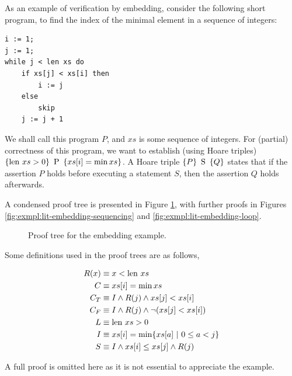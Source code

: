 \begin{example}
  \label{exmpl:lit-embedding}
  As an example of verification by embedding, consider the following
  short program, to find the index of the minimal element in a
  sequence of integers:

\begin{verbatim}
i := 1;
j := 1;
while j < len xs do
    if xs[j] < xs[i] then
        i := j
    else
        skip
    j := j + 1
\end{verbatim}

  We shall call this program $P$, and $xs$ is some sequence of
  integers. For (partial) correctness of this program, we want to
  establish (using Hoare triples) $\htriple{\len xs > 0}{P}{xs[i] =
    \min xs}$. A Hoare triple $\htriple{P}{S}{Q}$ states that if the
  assertion $P$ holds before executing a statement $S$, then the
  assertion $Q$ holds afterwards.

  A condensed proof tree is presented in Figure
  \ref{fig:exmpl:lit-embedding-tree}, with further proofs in Figures
  \ref{fig:exmpl:lit-embedding-sequencing} and
  \ref{fig:exmpl:lit-embedding-loop}.

  \begin{figure}[t]
    \centering
    \begin{prooftree}


    \end{prooftree}
    \caption{Proof tree for the embedding example.}
    \label{fig:exmpl:lit-embedding-tree}
  \end{figure}

  Some definitions used in the proof trees are as follows,

  \begin{align*}
    R(x) &\equiv x < \len xs\\
    C    &\equiv xs[i] = \min xs\\
    C_{T} & \equiv I \land R(j) \land xs[j] < xs[i]\\
    C_{F} & \equiv I \land R(j) \land \lnot(xs[j] < xs[i])\\
    L    & \equiv \len xs > 0\\
    I    & \equiv xs[i] = \min \{xs[a]~|~0 \leq a < j\}\\
    S    & \equiv I \land xs[i] \leq xs[j] \land R(j)
  \end{align*}

  A full proof is omitted here as it is not essential to appreciate
  the example.
\end{example}

